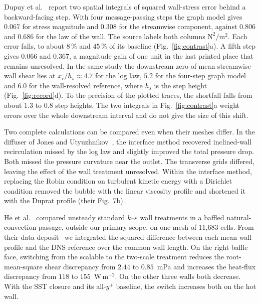 \documentclass[pdflatex,sn-nature,iicol]{sn-jnl}
\begin{document}
Dupuy et al.~\cite{Dupuy2023graph} report two spatial integrals of squared wall-stress error behind a backward-facing step. With four message-passing steps the graph model gives $0.067$ for stress magnitude and $0.308$ for the streamwise component, against $0.806$ and $0.686$ for the law of the wall. The source labels both columns $\mathrm{N}^2/\mathrm{m}^2$. Each error falls, to about $8\,\%$ and $45\,\%$ of its baseline (Fig.~\ref{fig:contrast}a). A fifth step gives $0.066$ and $0.367$, a magnitude gain of one unit in the last printed place that remains unresolved. In the same study the downstream zero of mean streamwise wall shear lies at $x_r/h_s\approx4.7$ for the log law, $5.2$ for the four-step graph model and $6.0$ for the wall-resolved reference, where $h_s$ is the step height (Fig.~\ref{fig:record}d). To the precision of the plotted traces, the shortfall falls from about $1.3$ to $0.8$ step heights. The two integrals in Fig.~\ref{fig:contrast}a weight errors over the whole downstream interval and do not give the size of this shift.

Two complete calculations can be compared even when their meshes differ. In the diffuser of Jones and Utyuzhnikov~\cite{Jones2015}, the interface method recovered inclined-wall recirculation missed by the log law and slightly improved the total pressure drop. Both missed the pressure curvature near the outlet. The transverse grids differed, leaving the effect of the wall treatment unresolved. Within the interface method, replacing the Robin condition on turbulent kinetic energy with a Dirichlet condition removed the bubble with the linear viscosity profile and shortened it with the Duprat profile (their Fig.~7b).

He et al.~\cite{HeRVACS2026} compared unsteady standard $k$--$\varepsilon$ wall treatments in a baffled natural-convection passage, outside our primary scope, on one mesh of 11,683 cells. From their data deposit~\cite{HeRVACSData} we integrated the squared difference between each mean wall profile and the DNS reference over the common wall length. On the right baffle face, switching from the scalable to the two-scale treatment reduces the root-mean-square shear discrepancy from $2.44$ to $0.85$~mPa and increases the heat-flux discrepancy from $118$ to $155$~W\,m$^{-2}$. On the other three walls both decrease. With the SST closure and its all-$y^+$ baseline, the switch increases both on the hot wall.
\end{document}
